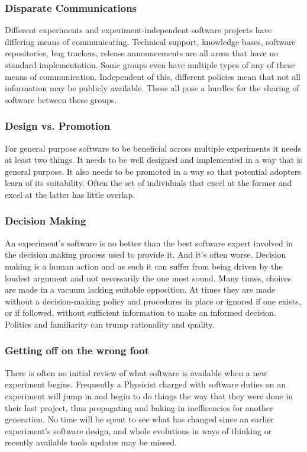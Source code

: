 \subsubsection{Disparate Communications}

Different experiments and experiment-independent software projects
have differing means of communicating.  Technical support, knowledge
bases, software repositories, bug trackers, release announcements are
all areas that have no standard implementation.  Some groups even
have multiple types of any of these means of communication.
Independent of this, different policies mean that not all information
may be publicly available.  These all pose a hurdles for the sharing of 
software between these groups.

\subsubsection{Design vs. Promotion}

For general purpose software to be beneficial across multiple
experiments it needs at least two things.  It needs to be well
designed and implemented in a way that is general purpose.  It
also needs to be promoted in a way so that potential adopters learn of
its suitability.  Often the set of individuals that excel at the
former and excel at the latter has little overlap.

\subsubsection{Decision Making}

An experiment's software is no better than the best software expert
involved in the decision making process used to provide it. And it's often worse.
Decision making is a human action and as such it can suffer from being
driven by the loudest argument and not necessarily the one most sound.
Many times, choices are made in a vacuum lacking suitable opposition.
At times they are made without a decision-making policy and procedures in place or
ignored if one exists, or if followed, without sufficient information
to make an informed decision.  Politics and familiarity can trump
rationality and quality.

\subsubsection{Getting off on the wrong foot}

There is often no initial review of what software is available when a new experiment begins.
Frequently a Physicist charged with software duties on an experiment will 
jump in and begin to do things the way that they were done in their 
last project, thus propagating and baking in inefficencies for another generation.  
No time will be spent to see what has changed since an earlier experiment's 
software design, and whole evolutions in ways of thinking or recently available
tools updates may be missed.


